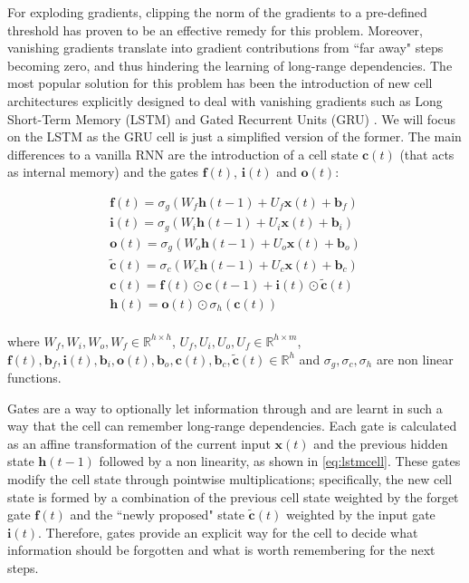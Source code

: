 For exploding gradients, clipping the norm of the gradients to a pre-defined threshold has proven to be an effective remedy for this problem. Moreover, vanishing gradients translate into gradient contributions from ``far away" steps becoming zero, and thus hindering the learning of long-range dependencies. The most popular solution for this problem has been the introduction of new cell architectures explicitly designed to deal with vanishing gradients such as Long Short-Term Memory (LSTM) \cite{hochreiter1997long} and Gated Recurrent Units (GRU) \cite{cho2014learning}. We will focus on the LSTM as the GRU cell is just a simplified version of the former. The main differences to a vanilla RNN are the introduction of a cell state $\mathbf{c}(t)$ (that acts as internal memory) and the gates $\mathbf{f}(t)$, $\mathbf{i}(t)$ and $\mathbf{o}(t)$: 

\begin{equation} \label{eq:lstmcell}
	\begin{gathered}
		\mathbf{f}(t) = \sigma_g(W_f \mathbf{h}(t-1) + U_f\mathbf{x}(t) + \mathbf{b}_f) \\
		\mathbf{i}(t) = \sigma_g(W_i \mathbf{h}(t-1) + U_i \mathbf{x}(t) + \mathbf{b}_i) \\
		\mathbf{o}(t) = \sigma_g(W_o \mathbf{h}(t-1) + U_o \mathbf{x}(t) + \mathbf{b}_o) \\
		\mathbf{\tilde{c}}(t) = \sigma_c(W_c \mathbf{h}(t-1) + U_c \mathbf{x}(t) + \mathbf{b}_c) \\
		\mathbf{c}(t) = \mathbf{f}(t) \odot \mathbf{c}(t-1) + \mathbf{i}(t) \odot \mathbf{\tilde{c}}(t) \\
		\mathbf{h}(t) = \mathbf{o}(t) \odot \sigma_h(\mathbf{c}(t))\\
	\end{gathered}
\end{equation}

where $W_f,W_i,W_o,W_f \in \mathbb{R}^{h \times h}$, $U_f,U_i,U_o,U_f \in \mathbb{R}^{h \times m}$, $\mathbf{f}(t),\mathbf{b}_f,\mathbf{i}(t),\mathbf{b}_i,  \allowbreak \mathbf{o}(t),\mathbf{b}_o,\mathbf{c}(t),\mathbf{b}_c,\mathbf{\tilde{c}}(t) \in \mathbb{R}^{h}$ and $\sigma_g,\sigma_c,\sigma_h$ are non linear functions. 

Gates are a way to optionally let information through and are learnt in such a way that the cell can remember long-range dependencies. Each gate is calculated as an affine transformation of the current input $\mathbf{x}(t)$ and the previous hidden state $\mathbf{h}(t-1)$ followed by a non linearity, as shown in \autoref{eq:lstmcell}. These gates modify the cell state through pointwise multiplications; specifically, the new cell state is formed by a combination of the previous cell state weighted by the forget gate $\mathbf{f}(t)$ and the ``newly proposed" state $\mathbf{\tilde{c}}(t)$ weighted by the input gate $\mathbf{i}(t)$. Therefore, gates provide an explicit way for the cell to decide what information should be forgotten and what is worth remembering for the next steps.  

